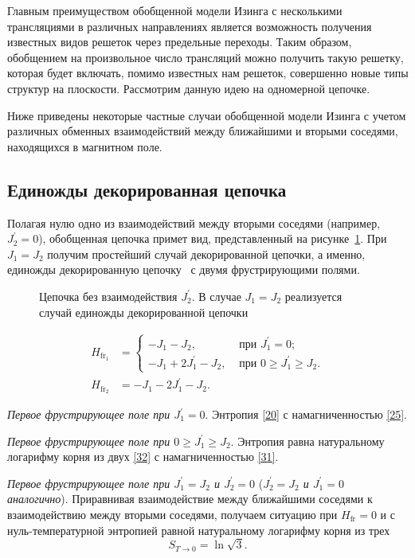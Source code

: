 Главным преимуществом обобщенной модели Изинга с несколькими трансляциями в различных направлениях является возможность получения известных видов решеток через предельные переходы. Таким образом, обобщением на произвольное число трансляций можно получить такую решетку, которая будет включать, помимо известных нам решеток, совершенно новые типы структур на плоскости. Рассмотрим данную идею на одномерной цепочке. 

Ниже приведены некоторые частные случаи обобщенной модели Изинга с учетом различных обменных взаимодействий между ближайшими и вторыми соседями, находящихся в магнитном поле. 

\subsection{Единожды декорированная цепочка}

Полагая нулю одно из взаимодействий между вторыми соседями (например, $J_2^{'} = 0$), обобщенная цепочка примет вид, представленный на рисунке~\ref{oneDecorChain}. При $J_1 = J_2$ получим простейший случай декорированной цепочки, а именно, единожды декорированную цепочку~\cite{stephenson1970} с двумя фрустрирующими полями.

 \begin{figure}[h]
 	\caption{Цепочка без взаимодействия $J_2^{'}$. В случае $J_1=J_2$ реализуется случай единожды декорированной цепочки}
 	\label{oneDecorChain}
 \end{figure}

\[
\begin{aligned}
H_{\text{fr}_1}&=
\begin{cases}
-J_{1}-J_{2}, & \text{ при } J_{1}^{'}=0; \\
-J_{1}+2J_{1}^{'}-J_{2}, & \text{ при } 0 \ge J_{1}^{'}\ge J_{2}.
\end{cases}\\
H_{\text{fr}_2}&=-J_{1}-2J_{1}^{'}-J_{2}.
\end{aligned}
\]

\emph{Первое фрустрирующее поле при $J_{1}^{'}=0$}.  Энтропия \eqref{20} с намагниченностью \eqref{25}.

\emph{Первое фрустрирующее поле при $0 \ge J_{1}^{'}\ge J_{2}$}. Энтропия равна натуральному логарифму корня из двух \eqref{32} с намагниченностью \eqref{31}.

\emph{Первое фрустрирующее поле при $J_1^{'} = J_2$ и $J_2^{'} = 0$} (\emph{$J_2^{'} = J_2$ и $J_1^{'} = 0$ аналогично}). Приравнивая взаимодействие между ближайшими соседями к взаимодействию между вторыми соседями, получаем ситуацию при $H_{\text{fr}} = 0$ и с нуль-температурной энтропией равной натуральному логарифму корня из трех 
\begin{equation}
S_{T\rightarrow 0}=\ln \sqrt{3}.
\label{39}
\end{equation}

